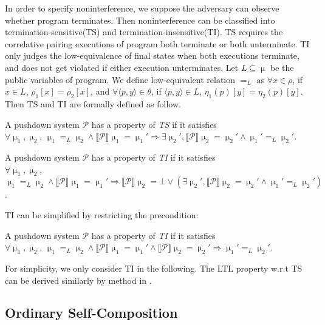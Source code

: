 \documentclass{llncs}
\begin{document}
In order to specify noninterference, we suppose the adversary can
observe whether program terminates. Then noninterference can be
classified into termination-sensitive(TS) and
termination-insensitive(TI). TS requires the correlative pairing
executions of program both terminate or both unterminate. TI only
judges the \textsf{low}-equivalence of final states when both
executions terminate, and does not get violated if either execution
unterminates. Let $L\subseteq \upmu$ be the public variables of
program. We define low-equivalent relation $=_L$ as $\forall x\in
\rho$, if $x\in L$, $\rho_1[x]=\rho_2[x]$, and $\forall \langle
p,y\rangle \in \theta$, if $\langle p,y\rangle \in L$,
$\eta_1(p)[y]=\eta_2(p)[y]$. Then TS and TI are formally defined as
follow.
\begin{definition}[TS]
A pushdown system $\mathcal {P}$ has a
property of \emph{TS} if it satisfies\\
\indent $\forall \upmu_1,\upmu_2$, $\upmu_1 =_L \upmu_2\wedge
\llbracket \mathcal {P}\rrbracket \upmu_1=\upmu_1' \Rightarrow
\exists \upmu_2', \llbracket \mathcal {P}\rrbracket
\upmu_2=\upmu_2'\wedge \upmu_1' =_L \upmu_2'$.
\end{definition}
\begin{definition}[TI]
A pushdown system $\mathcal {P}$ has a
property of \emph{TI} if it satisfies\\
$\forall \upmu_1,\upmu_2$, $\upmu_1 =_L \upmu_2\wedge \llbracket
\mathcal {P}\rrbracket \upmu_1=\upmu_1' \Rightarrow \llbracket
\mathcal {P}\rrbracket \upmu_2=\bot \vee (\exists \upmu_2',
\llbracket \mathcal {P}\rrbracket \upmu_2=\upmu_2'\wedge \upmu_1'
=_L \upmu_2')$.
\end{definition}
\indent TI can be simplified by restricting the precondition:
\begin{definition}[TI$'$]
A pushdown system $\mathcal {P}$ has a
property of \emph{TI} if it satisfies\\
\indent $\forall \upmu_1,\upmu_2$, $\upmu_1 =_L \upmu_2\wedge
\llbracket \mathcal {P}\rrbracket \upmu_1=\upmu_1'\wedge \llbracket
\mathcal {P}\rrbracket \upmu_2=\upmu_2' \Rightarrow \upmu_1' =_L
\upmu_2'$.
\end{definition}
For simplicity, we only consider TI in the following. The LTL
property w.r.t TS can be derived similarly by method in
\cite{DBLP:conf/csfw/BartheDR04}.

\subsection{\label{subsec:osc}Ordinary Self-Composition}
\end{document}
